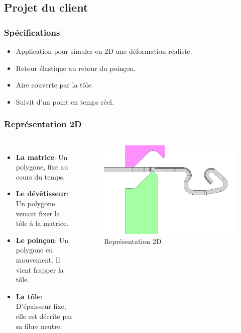 \documentclass{beamer}
\begin{document}
\subsection{Projet du client}
\begin{frame}
    \frametitle{Spécifications}
    \begin{itemize}
        \item Application pour simuler en 2D une déformation réaliste.
        \item Retour élastique au retour du poinçon.
        \item Aire couverte par la tôle.
        \item Suivit d'un point en temps réel.
    \end{itemize}
\end{frame}
\begin{frame}
    \frametitle{Représentation 2D}
    \begin{columns}
        \begin{itemize}
            \item \textbf{La matrice}: 
                Un polygone, fixe au cours du temps.
            \item \textbf{Le dévêtisseur}:
                Un polygone venant fixer la tôle à la matrice.
            \item \textbf{Le poinçon}:
                Un polygone en mouvement. Il vient frapper la tôle.
            \item \textbf{La tôle}:
                D'épaisseur fixe, elle est décrite par sa fibre neutre.
        \end{itemize}
        \begin{figure}
            \includegraphics[width=\textwidth]{img/fibreNeutre.jpg}
            \caption{Représentation 2D}
        \end{figure}
    \end{columns}
\end{frame}
\end{document}
